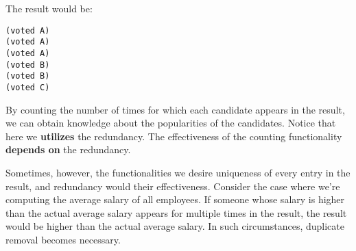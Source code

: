 \documentclass[../main.tex]{subfiles}
\begin{document}
The result would be:

\begin{lstlisting}
(voted A)
(voted A)
(voted A)
(voted B)
(voted B)
(voted C)
\end{lstlisting}

By counting the number of times for which each candidate appears in the result, we can obtain knowledge about the popularities of the candidates. Notice that here we \textbf{utilizes} the redundancy. The effectiveness of the counting functionality \textbf{depends on} the redundancy.

Sometimes, however, the functionalities we desire  uniqueness of every entry in the result, and redundancy would  their effectiveness. Consider the case where we're computing the average salary of all employees. If someone whose salary is higher than the actual average salary appears for multiple times in the result, the result would be higher than the actual average salary. In such circumstances, duplicate removal becomes necessary.
\end{document}
